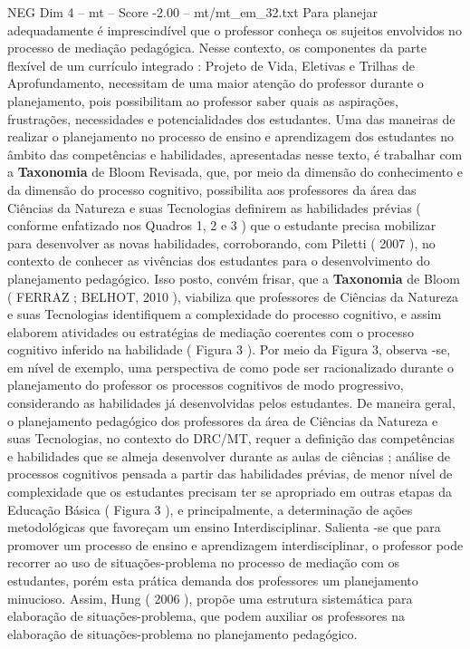 \begin{textsample}{NEG Dim 4 – mt – Score -2.00 – mt/mt\_em\_32.txt}
Para planejar adequadamente é imprescindível que o professor conheça os sujeitos envolvidos no processo de mediação pedagógica.
Nesse contexto, os componentes da parte flexível de um currículo integrado : Projeto de Vida, Eletivas e Trilhas de Aprofundamento, necessitam de uma maior atenção do professor durante o planejamento, pois possibilitam ao professor saber quais as aspirações, frustrações, necessidades e potencialidades dos estudantes.
Uma das maneiras de realizar o planejamento no processo de ensino e aprendizagem dos estudantes no âmbito das competências e habilidades, apresentadas nesse texto, é trabalhar com a \textbf{Taxonomia} de Bloom Revisada, que, por meio da dimensão do conhecimento e da dimensão do processo cognitivo, possibilita aos professores da área das Ciências da Natureza e suas Tecnologias definirem as habilidades prévias ( conforme enfatizado nos Quadros 1, 2 e 3 ) que o estudante precisa mobilizar para desenvolver as novas habilidades, corroborando, com Piletti ( 2007 ), no contexto de conhecer as vivências dos estudantes para o desenvolvimento do planejamento pedagógico.
Isso posto, convém frisar, que a \textbf{Taxonomia} de Bloom ( FERRAZ ; BELHOT, 2010 ), viabiliza que professores de Ciências da Natureza e suas Tecnologias identifiquem a complexidade do processo cognitivo, e assim elaborem atividades ou estratégias de mediação coerentes com o processo cognitivo inferido na habilidade ( Figura 3 ).
Por meio da Figura 3, observa -se, em nível de exemplo, uma perspectiva de como pode ser racionalizado durante o planejamento do professor os processos cognitivos de modo progressivo, considerando as habilidades já desenvolvidas pelos estudantes.
De maneira geral, o planejamento pedagógico dos professores da área de Ciências da Natureza e suas Tecnologias, no contexto do DRC/MT, requer a definição das competências e habilidades que se almeja desenvolver durante as aulas de ciências ; análise de processos cognitivos pensada a partir das habilidades prévias, de menor nível de complexidade que os estudantes precisam ter se apropriado em outras etapas da Educação Básica ( Figura 3 ), e principalmente, a determinação de ações metodológicas que favoreçam um ensino Interdisciplinar.
Salienta -se que para promover um processo de ensino e aprendizagem interdisciplinar, o professor pode recorrer ao uso de situações-problema no processo de mediação com os estudantes, porém esta prática demanda dos professores um planejamento minucioso.
Assim, Hung ( 2006 ), propõe uma estrutura sistemática para elaboração de situações-problema, que podem auxiliar os professores na elaboração de situações-problema no planejamento pedagógico.

\end{textsample}
